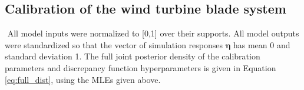 \documentclass[12pt]{article}
\begin{document}


\subsection{Calibration of the wind turbine blade system}\label{the_model}
%
$
$
%
%
All model inputs were normalized to [0,1] over their supports. 
%
All model outputs were standardized so that the vector of simulation responses $\boldsymbol\eta$ has mean 0 and standard deviation 1.
%
%
The full joint posterior density of the calibration parameters and discrepancy function hyperparameters is given in Equation \eqref{eq:full_dist}, using the MLEs given above.%
%
\end{document}

